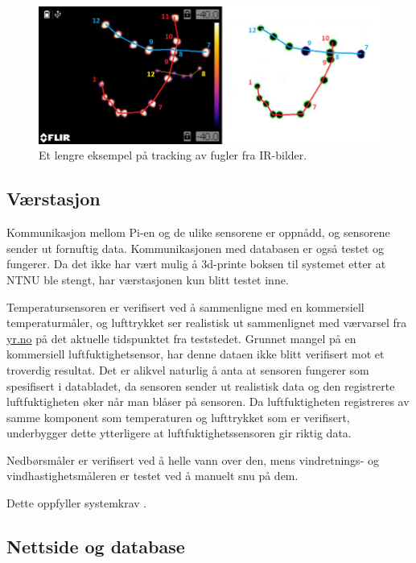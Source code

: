 \begin{figure}[H]
    \centering
    \includegraphics[width=.8\textwidth]{verifikasjon-test/Tracking_ex/langt_eksempel.png}
    \caption{Et lengre eksempel på tracking av fugler fra IR-bilder.}
    \label{fig:verifikasjon:long}
\end{figure}


\subsection{Værstasjon}\label{sec:verifikasjon:telemetri}
Kommunikasjon mellom Pi-en og de ulike sensorene er oppnådd, og sensorene sender ut fornuftig data. Kommunikasjonen med databasen er også testet og fungerer.
Da det ikke har vært mulig å 3d-printe boksen til systemet etter at NTNU ble stengt, har værstasjonen kun blitt testet inne. 

Temperatursensoren er verifisert ved å sammenligne med en kommersiell temperaturmåler, og lufttrykket ser realistisk ut sammenlignet med værvarsel fra \url{yr.no} på det aktuelle tidspunktet fra teststedet.
Grunnet mangel på en kommersiell luftfuktighetsensor, har denne dataen ikke blitt verifisert mot et troverdig resultat.
Det er alikvel naturlig å anta at sensoren fungerer som spesifisert i databladet\cite{bme280}, da sensoren sender ut realistisk data og den registrerte luftfuktigheten øker når man blåser på sensoren.
Da luftfuktigheten registreres av samme komponent som temperaturen og lufttrykket som er verifisert, underbygger dette ytterligere at luftfuktighetssensoren gir riktig data.

Nedbørsmåler er verifisert ved å helle vann over den, mens vindretnings- og vindhastighetsmåleren er testet ved å manuelt snu på dem.

Dette oppfyller systemkrav .


\subsection{Nettside og database}\label{sec:verifikasjon:nettside}

